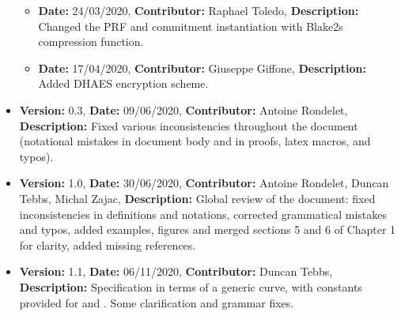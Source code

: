 \begin{itemize}
\begin{itemize}
            \item \textbf{Date:} 24/03/2020, \textbf{Contributor:} Raphael Toledo, \textbf{Description:} Changed the PRF and commitment instantiation with Blake2s compression function.
            \item \textbf{Date:} 17/04/2020, \textbf{Contributor:} Giuseppe Giffone, \textbf{Description:} Added DHAES encryption scheme.
        \end{itemize}
    \item \textbf{Version:} 0.3, \textbf{Date:} 09/06/2020, \textbf{Contributor:} Antoine Rondelet, \textbf{Description:} Fixed various inconsistencies throughout the document (notational mistakes in document body and in proofs, latex macros, and typos).
    \item \textbf{Version:} 1.0, \textbf{Date:} 30/06/2020, \textbf{Contributor:} Antoine Rondelet, Duncan Tebbs, Michal Zajac, \textbf{Description:} Global review of the document: fixed inconsistencies in definitions and notations, corrected grammatical mistakes and typos, added examples, figures and merged sections 5 and 6 of Chapter 1 for clarity, added missing references.
    \item \textbf{Version:} 1.1, \textbf{Date:} 06/11/2020, \textbf{Contributor:} Duncan Tebbs, \textbf{Description:} Specification in terms of a generic curve, with constants provided for \BNCurve and \BLSCurve. Some clarification and grammar fixes.
\end{itemize}
